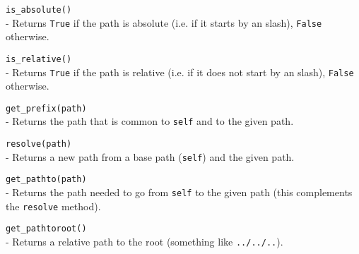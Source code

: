 \begin{api}
  {\tt is\_absolute()}\\
  - Returns {\tt True} if the path is absolute (i.e. if it starts by an
  slash), {\tt False} otherwise.

  {\tt is\_relative()}\\
  - Returns {\tt True} if the path is relative (i.e. if it does not start
    by an slash), {\tt False} otherwise.

  {\tt get\_prefix(path)}\\
  - Returns the path that is common to {\tt self} and to the given path.

  {\tt resolve(path)}\\
  - Returns a new path from a base path ({\tt self}) and the given path.

  {\tt get\_pathto(path)}\\
  - Returns the path needed to go from {\tt self} to the given path (this
    complements the {\tt resolve} method).

  {\tt get\_pathtoroot()}\\
  - Returns a relative path to the root (something like {\tt ../../..}).
\end{api}

